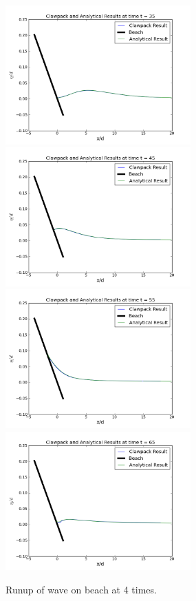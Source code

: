\begin{figure}[ht]
\hfil\includegraphics[width=2.8in]{../bp01/canonical-beach/bp1compt35.png}\hfil
\hfil\includegraphics[width=2.8in]{../bp01/canonical-beach/bp1compt45.png}\hfil
\vskip 5pt
\hfil\includegraphics[width=2.8in]{../bp01/canonical-beach/bp1compt55.png}\hfil
\hfil\includegraphics[width=2.8in]{../bp01/canonical-beach/bp1compt65.png}\hfil
\caption{\label{fig:bp1frames} 
Runup of wave on beach at 4 times.
}
\end{figure}


